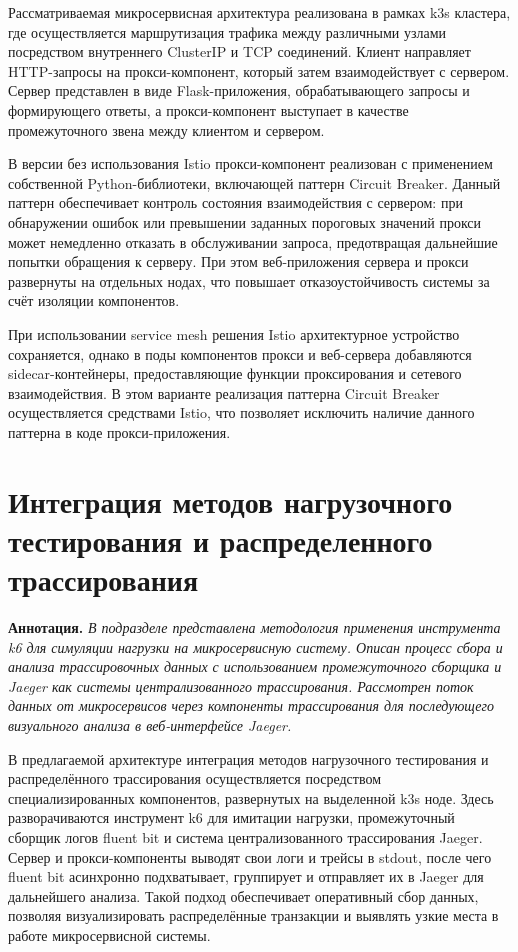 Рассматриваемая микросервисная архитектура реализована в рамках k3s кластера, где осуществляется маршрутизация трафика между различными узлами посредством внутреннего ClusterIP и TCP соединений. Клиент направляет HTTP-запросы на прокси-компонент, который затем взаимодействует с сервером. Сервер представлен в виде Flask-приложения, обрабатывающего запросы и формирующего ответы, а прокси-компонент выступает в качестве промежуточного звена между клиентом и сервером.

В версии без использования Istio прокси-компонент реализован с применением собственной Python-библиотеки, включающей паттерн Circuit Breaker. Данный паттерн обеспечивает контроль состояния взаимодействия с сервером: при обнаружении ошибок или превышении заданных пороговых значений прокси может немедленно отказать в обслуживании запроса, предотвращая дальнейшие попытки обращения к серверу. При этом веб-приложения сервера и прокси развернуты на отдельных нодах, что повышает отказоустойчивость системы за счёт изоляции компонентов.

При использовании service mesh решения Istio архитектурное устройство сохраняется, однако в поды компонентов прокси и веб-сервера добавляются sidecar-контейнеры, предоставляющие функции проксирования и сетевого взаимодействия. В этом варианте реализация паттерна Circuit Breaker осуществляется средствами Istio, что позволяет исключить наличие данного паттерна в коде прокси-приложения. 

  
\section{Интеграция методов нагрузочного тестирования и распределенного трассирования}
  
\textbf{Аннотация.} \textit{В подразделе представлена методология применения инструмента k6 для симуляции нагрузки на микросервисную систему. Описан процесс сбора и анализа трассировочных данных с использованием промежуточного сборщика и Jaeger как системы централизованного трассирования. Рассмотрен поток данных от микросервисов через компоненты трассирования для последующего визуального анализа в веб-интерфейсе Jaeger.}

В предлагаемой архитектуре интеграция методов нагрузочного тестирования и распределённого трассирования осуществляется посредством специализированных компонентов, развернутых на выделенной k3s ноде. Здесь разворачиваются инструмент k6 для имитации нагрузки, промежуточный сборщик логов fluent bit и система централизованного трассирования Jaeger. Сервер и прокси-компоненты выводят свои логи и трейсы в stdout, после чего fluent bit асинхронно подхватывает, группирует и отправляет их в Jaeger для дальнейшего анализа. Такой подход обеспечивает оперативный сбор данных, позволяя визуализировать распределённые транзакции и выявлять узкие места в работе микросервисной системы.

